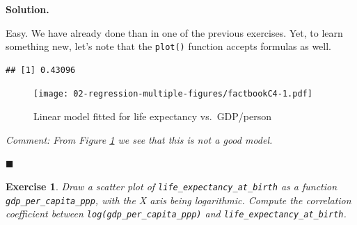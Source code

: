 \documentclass[10pt,b5paper,krantz1]{krantz}
\newenvironment{Shaded}{\begin{snugshade}}{\end{snugshade}}
\newcommand{\DataTypeTok}[1]{\textcolor[rgb]{0.27,0.27,0.27}{#1}}
\newcommand{\KeywordTok}[1]{\textcolor[rgb]{0.27,0.27,0.27}{\textbf{#1}}}
\newcommand{\NormalTok}[1]{#1}
\newcommand{\OperatorTok}[1]{\textcolor[rgb]{0.43,0.43,0.43}{\textbf{#1}}}
\newcommand{\StringTok}[1]{\textcolor[rgb]{0.5,0.5,0.5}{#1}}
\newtheorem{exercise}{Exercise}[chapter]
\newenvironment{solution}{%
\bigskip\noindent\textbf{Solution. }%
\it\ignorespaces%
\ignorespaces%
}{\ignorespaces%
\hfill$\blacksquare$%
}
\begin{document}
\begin{solution}

Easy. We have already done than in one of the previous exercises.
Yet, to learn something new, let's note that the \texttt{plot()} function
accepts formulas as well.

\begin{Shaded}
\end{Shaded}

\begin{verbatim}
## [1] 0.43096
\end{verbatim}

\begin{figure}
\hypertarget{fig:factbookC4}{%
\centering
\texttt{[image: 02-regression-multiple-figures/factbookC4-1.pdf]}
\caption{Linear model fitted for life expectancy vs.~GDP/person}\label{fig:factbookC4}
}
\end{figure}

\emph{Comment: From Figure \ref{fig:factbookC4} we see that
this is not a good model.}

\end{solution}

\begin{exercise}

Draw a scatter plot of \texttt{life\_expectancy\_at\_birth} as a function
\texttt{gdp\_per\_capita\_ppp}, with the X axis being logarithmic.
Compute the correlation coefficient between
\texttt{log(gdp\_per\_capita\_ppp)} and \texttt{life\_expectancy\_at\_birth}.

\end{exercise}
\end{document}
